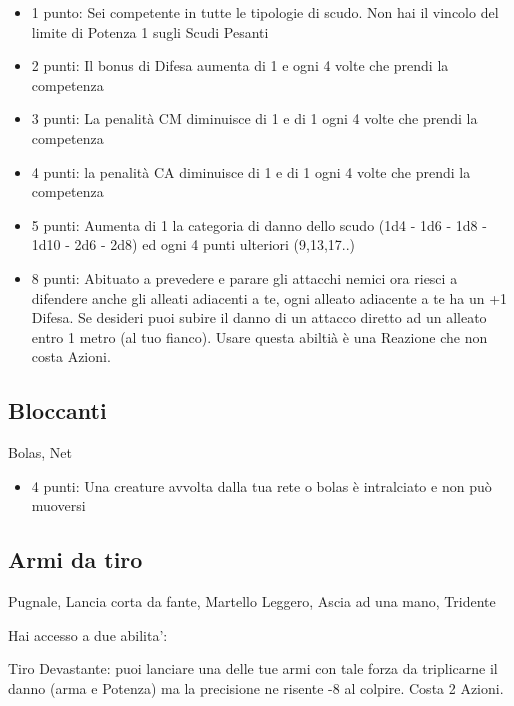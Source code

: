 \documentclass[a4paper,11pt,twoside,openany]{book}
\begin{document}
\begin{itemize}
	\item 1 punto: Sei competente in tutte le tipologie di scudo. Non hai il vincolo del limite di Potenza 1 sugli Scudi Pesanti

	\item 2 punti: Il bonus di Difesa aumenta di 1 e ogni 4 volte che prendi la competenza

	\item 3 punti: La penalità CM diminuisce di 1 e di 1 ogni 4 volte che prendi la competenza

	\item 4 punti: la penalità CA diminuisce di 1 e di 1 ogni 4 volte che prendi la competenza

	\item 5 punti: Aumenta di 1 la categoria di danno dello scudo (1d4 - 1d6 - 1d8 - 1d10 - 2d6 - 2d8) ed ogni 4 punti ulteriori (9,13,17..)

	\item 8 punti: Abituato a prevedere e parare gli attacchi nemici ora riesci a difendere anche gli alleati adiacenti a te, ogni alleato adiacente a te ha un +1 Difesa. Se desideri puoi subire il danno di un attacco diretto ad un alleato entro 1 metro (al tuo fianco). Usare questa abiltià è una Reazione che non costa Azioni.

\end{itemize}

\subsection{Bloccanti} Bolas, Net

\begin{itemize}
	\item 4 punti: Una creature avvolta dalla tua rete o bolas è intralciato e non può muoversi

\end{itemize}

\subsection{Armi da tiro} Pugnale, Lancia corta da fante, Martello Leggero, Ascia ad una mano, Tridente

Hai accesso a due abilita':

Tiro Devastante: puoi lanciare una delle tue armi con tale forza da triplicarne il danno (arma e Potenza) ma la precisione ne risente -8 al colpire. Costa 2 Azioni.
\end{document}
